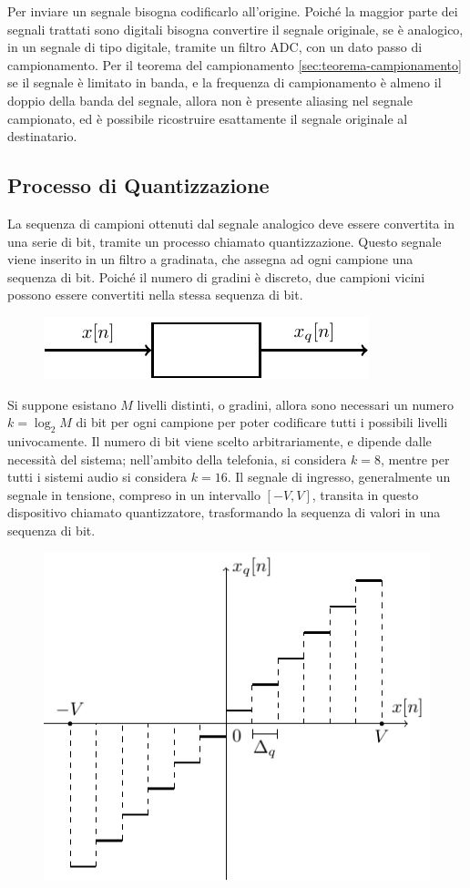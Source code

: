\documentclass{article}
\numberwithin{equation}{subsection}
\begin{document}
Per inviare un segnale bisogna codificarlo all'origine. Poiché la maggior parte dei segnali trattati sono digitali bisogna convertire il segnale 
originale, se è analogico, in un segnale di tipo digitale, tramite un filtro ADC, con un dato passo di campionamento. 
Per il teorema del campionamento \ref{sec:teorema-campionamento} se il segnale è limitato in banda, e la frequenza di campionamento è almeno il doppio della banda del segnale, 
allora non è presente aliasing nel segnale campionato, ed è possibile ricostruire esattamente il segnale originale al destinatario. 

\subsection{Processo di Quantizzazione}

La sequenza di campioni ottenuti dal segnale analogico deve essere convertita in una serie di bit, tramite un processo chiamato quantizzazione. Questo segnale viene inserito 
in un filtro a gradinata, che assegna ad ogni campione una sequenza di bit. Poiché il numero di gradini è discreto, due campioni vicini possono essere convertiti nella 
stessa sequenza di bit. 
\begin{figure}[H]%
    \centering
    \includegraphics{quantizzatore.pdf}%
\end{figure}
Si suppone esistano $M$ livelli distinti, o gradini, allora sono necessari un numero $k=\log_{2}M$ di bit per ogni campione per poter codificare tutti i possibili livelli 
univocamente. 
Il numero di bit viene scelto arbitrariamente, e dipende dalle necessità del sistema; nell'ambito della telefonia, si considera $k=8$, mentre per tutti i sistemi audio si 
considera $k=16$. 
Il segnale di ingresso, generalmente un segnale in tensione, compreso in un intervallo $[-V,V]$, transita in questo dispositivo chiamato quantizzatore, trasformando la sequenza di 
valori in una sequenza di bit. 
\begin{figure}[H]%
    \centering
    \includegraphics{quantizzazione.pdf}
\end{figure}
\end{document}
